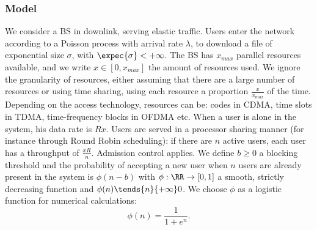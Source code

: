 \documentclass[10pt,conference,letterpaper]{IEEEtran}
\begin{document}
\subsubsection{Model}
	We consider a \ac{BS} in downlink, serving elastic traffic. Users enter the network according to a Poisson process with arrival rate $\lambda$, to download a file of exponential size $\sigma$, with $\expec{\sigma} < +\infty$. The \ac{BS} has $x_{max}$ parallel resources available, and we write $x \in [0,x_{max}]$ the amount of resources used. We ignore the granularity of resources, either assuming that there are a large number of resources or using time sharing, using each resource a proportion $\frac{x}{x_{max}}$ of the time. Depending on the access technology, resources can be: codes in \ac{CDMA}, time slots in \ac{TDMA}, time-frequency blocks in \ac{OFDMA} etc. When a user is alone in the system, his data rate is $R x$. Users are served in a processor sharing manner (for instance through Round Robin scheduling): if there are $n$ active users, each user has a throughput of $\frac{x R}{n}$. Admission control applies. We define $b \geq 0$ a blocking threshold and the probability of accepting a new user when $n$ users are already present in the system is $\phi(n - b)$ with $\phi:\RR \to [0,1]$ a smooth, strictly decreasing function and $\phi(n) \tends{n}{+\infty} 0$. We choose $\phi$ as a logistic function for numerical calculations:
\begin{equation} 
	\phi(n) = \frac{1}{1 + e^{n}}.
\end{equation}
	
\end{document}
